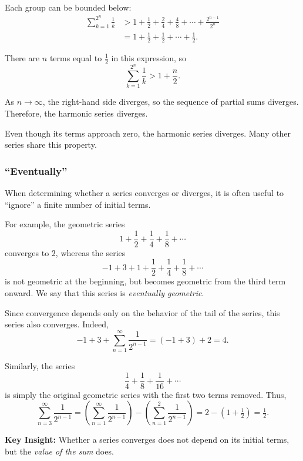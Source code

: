 Each group can be bounded below:
\[
\begin{aligned}
\sum_{k=1}^{2^n} \frac{1}{k}
&> 1 
+ \frac{1}{2}
+ \frac{2}{4}
+ \frac{4}{8}
+ \cdots
+ \frac{2^{n-1}}{2^n} \\
&= 1 + \frac{1}{2} + \frac{1}{2} + \cdots + \frac{1}{2}.
\end{aligned}
\]

There are $n$ terms equal to $\tfrac{1}{2}$ in this expression, so
\[
\sum_{k=1}^{2^n} \frac{1}{k} > 1 + \frac{n}{2}.
\]

As $n \to \infty$, the right-hand side diverges, so the sequence of 
partial sums diverges. Therefore, the harmonic series diverges.

\medskip

Even though its terms approach zero, the harmonic series diverges. 
Many other series share this property.

\subsubsection{``Eventually''}
\label{sss:even-a4ef}

When determining whether a series converges or diverges, it is often useful 
to ``ignore'' a finite number of initial terms.

For example, the geometric series
\[
1 + \frac{1}{2} + \frac{1}{4} + \frac{1}{8} + \cdots
\]
converges to $2$, whereas the series
\[
-1 + 3 + 1 + \frac{1}{2} + \frac{1}{4} + \frac{1}{8} + \cdots
\]
is not geometric at the beginning, but becomes geometric from the third 
term onward. We say that this series is \textit{eventually geometric}.

Since convergence depends only on the behavior of the tail of the series, 
this series also converges. Indeed,
\[
-1 + 3 + \sum_{n=1}^{\infty} \frac{1}{2^{n-1}} = (-1 + 3) + 2 = 4.
\]

Similarly, the series
\[
\frac{1}{4} + \frac{1}{8} + \frac{1}{16} + \cdots
\]
is simply the original geometric series with the first two terms removed. Thus,
\[
\sum_{n=3}^{\infty} \frac{1}{2^{n-1}}
= \left(\sum_{n=1}^{\infty} \frac{1}{2^{n-1}}\right)
- \left(\sum_{n=1}^{2} \frac{1}{2^{n-1}}\right)
= 2 - \left(1 + \tfrac{1}{2}\right)
= \tfrac{1}{2}.
\]

\medskip

\textbf{Key Insight:}  
Whether a series converges does not depend on its initial terms, but the 
\textit{value of the sum} does.



